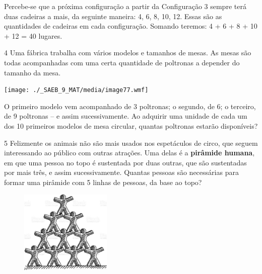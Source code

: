 \begin{escolha}
\begin{escolha}
\begin{largebox}
{Percebe-se que a próxima configuração a partir da Configuração 3 sempre 
terá duas cadeiras a mais, da seguinte maneira: 4, 6, 8, 10, 12. Essas 
são as quantidades de cadeiras em cada configuração. Somando teremos:
4 + 6 + 8 + 10 + 12 = 40 lugares.}
\end{largebox}

\num{4} Uma fábrica trabalha com vários modelos e tamanhos de mesas. As mesas
são todas acompanhadas com uma certa quantidade de poltronas a depender
do tamanho da mesa.

\texttt{[image: ./\_SAEB\_9\_MAT/media/image77.wmf]}

O primeiro modelo vem acompanhado de 3 poltronas; o segundo, de 6; o 
terceiro, de 9 poltronas -- e assim sucessivamente. Ao adquirir uma
unidade de cada um dos 10 primeiros modelos de mesa circular, quantas
poltronas estarão disponíveis?

\begin{boxmedio}
\end{boxmedio}

\num{5} Felizmente os animais não são mais usados nos espetáculos de circo,
que seguem interessando ao público com outras atrações. Uma delas é a 
\textbf{pirâmide humana}, em que uma pessoa no topo é sustentada por duas
outras, que são sustentadas por mais três, e assim sucessivamente. Quantas
pessoas são necessárias para formar uma pirâmide com 5 linhas de pessoas,
da base ao topo?

\begin{figure}
\centering
\includegraphics[width=1.71354in,height=1.56302in]{./_SAEB_9_MAT/media/image82.jpeg}
\end{figure}



\end{escolha}
\end{escolha}
